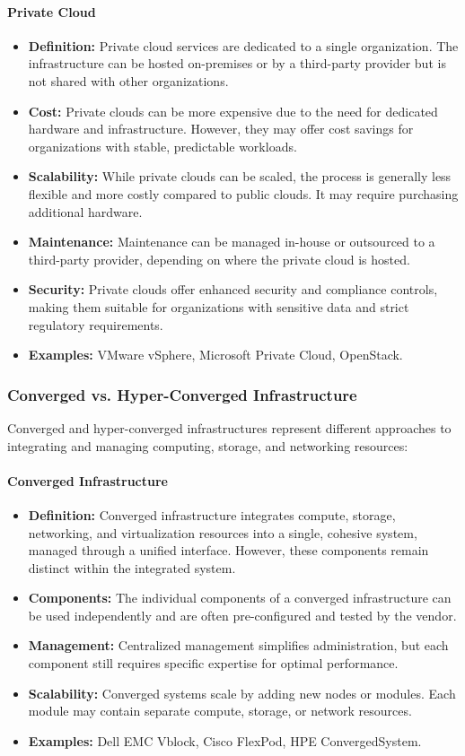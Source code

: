 \documentclass[a4paper,12pt]{report}
\begin{document}
\paragraph{Private Cloud}
\begin{itemize}
	\item \textbf{Definition:} Private cloud services are dedicated to a single organization. The infrastructure can be hosted on-premises or by a third-party provider but is not shared with other organizations.
	\item \textbf{Cost:} Private clouds can be more expensive due to the need for dedicated hardware and infrastructure. However, they may offer cost savings for organizations with stable, predictable workloads.
	\item \textbf{Scalability:} While private clouds can be scaled, the process is generally less flexible and more costly compared to public clouds. It may require purchasing additional hardware.
	\item \textbf{Maintenance:} Maintenance can be managed in-house or outsourced to a third-party provider, depending on where the private cloud is hosted.
	\item \textbf{Security:} Private clouds offer enhanced security and compliance controls, making them suitable for organizations with sensitive data and strict regulatory requirements.
	\item \textbf{Examples:} VMware vSphere, Microsoft Private Cloud, OpenStack.
\end{itemize}

\subsubsection{Converged vs. Hyper-Converged Infrastructure}
Converged and hyper-converged infrastructures represent different approaches to integrating and managing computing, storage, and networking resources:

\paragraph{Converged Infrastructure}
\begin{itemize}
	\item \textbf{Definition:} Converged infrastructure integrates compute, storage, networking, and virtualization resources into a single, cohesive system, managed through a unified interface. However, these components remain distinct within the integrated system.
	\item \textbf{Components:} The individual components of a converged infrastructure can be used independently and are often pre-configured and tested by the vendor.
	\item \textbf{Management:} Centralized management simplifies administration, but each component still requires specific expertise for optimal performance.
	\item \textbf{Scalability:} Converged systems scale by adding new nodes or modules. Each module may contain separate compute, storage, or network resources.
	\item \textbf{Examples:} Dell EMC Vblock, Cisco FlexPod, HPE ConvergedSystem.
\end{itemize}
\end{document}
